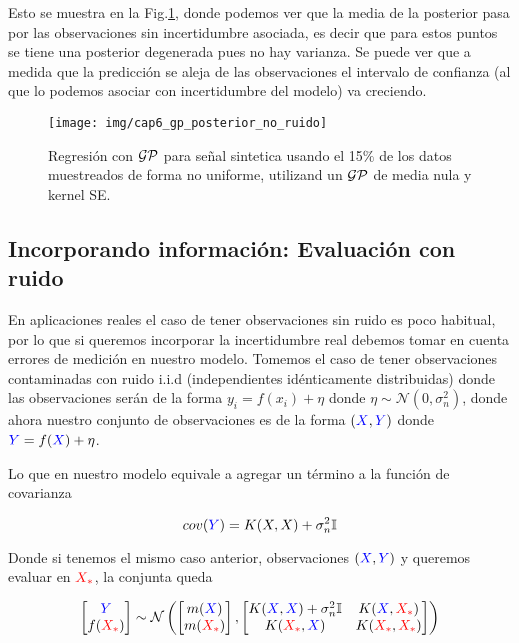 Esto se muestra en la Fig.\ref{fig:gp_2}, donde podemos ver que la media de la posterior pasa por las observaciones sin incertidumbre asociada, es decir que para estos puntos se tiene una posterior degenerada pues no hay varianza. Se puede ver que a medida que la predicción se aleja de las observaciones el intervalo de confianza (al que lo podemos asociar con incertidumbre del modelo) va creciendo.

\begin{figure}[H]
	\centering
	\texttt{[image: img/cap6\_gp\_posterior\_no\_ruido]}
	\caption{Regresión con $\mathcal{GP}$ para señal sintetica usando el 15$\%$ de los datos muestreados de forma no uniforme, utilizand un $\mathcal{GP}$ de media nula y kernel SE.} 
	\label{fig:gp_2}
\end{figure}

\subsection{Incorporando información: Evaluación con ruido}

En aplicaciones reales el caso de tener observaciones sin ruido es poco habitual, por lo que si queremos incorporar la incertidumbre real debemos tomar en cuenta errores de medición en nuestro modelo. Tomemos el caso de tener observaciones contaminadas con ruido i.i.d (independientes idénticamente distribuidas) donde las observaciones serán de la forma $y_i = f(x_i) + \eta$ donde $\eta \sim \mathcal{N}(0, \sigma_n^2)$, donde ahora nuestro conjunto de observaciones es de la forma $(\textcolor{blue}{X}, \textcolor{blue}{Y})$ donde $\textcolor{blue}{Y}=f(\textcolor{blue}{X}) + \eta$.

Lo que en nuestro modelo equivale a agregar un término a la función de covarianza

\begin{equation}
	cov(\textcolor{blue}{Y}) = K(X, X) + \sigma_n^2{\mathbb I}
\end{equation}

Donde si tenemos el mismo caso anterior, observaciones $(\textcolor{blue}{X}, \textcolor{blue}{Y})$ y queremos evaluar en $\textcolor{red}{X_*}$, la conjunta queda


\begin{align}
	\begin{bmatrix} \textcolor{blue}{Y} \\ f(\textcolor{red}{X_*})  \end{bmatrix}
	\sim \mathcal{N} \left(
	\begin{bmatrix} m(\textcolor{blue}{X}) \\ m(\textcolor{red}{X_*})  \end{bmatrix}, 
	\begin{bmatrix}
		K(\textcolor{blue}{X}, \textcolor{blue}{X}) + \sigma_n^2 {\mathbb I} & K(\textcolor{blue}{X}, \textcolor{red}{X_*}) \\ K(\textcolor{red}{X_*}, \textcolor{blue}{X}) & K(\textcolor{red}{X_*}, \textcolor{red}{X_*})
	\end{bmatrix}
	 \right)
\end{align}

